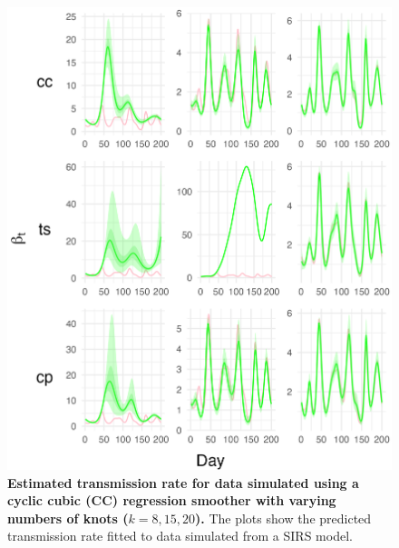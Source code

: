 \documentclass[
11pt, %
oneside, %
english, %
singlespacing, %
]{macthesis} %
\begin{document}
\begin{figure}
\centering
\includegraphics[width=\textwidth]{figure/Simulated/simulation_cc_20_k(8,15,20)_bsd2_beta2_plot_beta.png}
\caption[Estimated Simulated Data (CC) Transmission Rate]{\textbf{Estimated transmission rate for data simulated using a cyclic cubic (CC) regression smoother with varying numbers of knots (\(k = 8, 15, 20\)).} The plots show the predicted transmission rate fitted to data simulated from a SIRS model.}
\label{fig:transmission20cc}
\end{figure}
\end{document}
